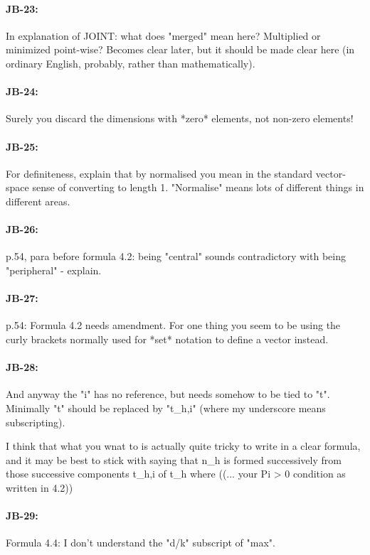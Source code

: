 \documentclass[11pt,a4paper]{article}
\begin{document}
\paragraph{JB-23:} In explanation of JOINT: what does "merged" mean here? Multiplied or minimized point-wise? Becomes clear later, but it should be made clear here (in ordinary English, probably, rather than mathematically).

\paragraph{JB-24:} Surely you discard the dimensions with *zero* elements, not non-zero elements!

\paragraph{JB-25:} For definiteness, explain that by normalised you mean in the standard vector-space sense of converting to length 1. "Normalise" means lots of different things in different areas.

\paragraph{JB-26:} p.54, para before formula 4.2: being "central" sounds contradictory with being "peripheral" - explain.

\paragraph{JB-27:} p.54: Formula 4.2 needs amendment. For one thing you seem to be using the curly brackets normally used for *set* notation to define a vector instead.

\paragraph{JB-28:} And anyway the "i" has no reference, but needs somehow to be tied to "t". Minimally "t" should be replaced by "t\_h,i" (where my underscore means subscripting).

I think that what you wnat to is actually quite tricky to write in a clear formula, and it may be best to stick with saying that n\_h is formed successively from those successive components t\_h,i of t\_h where ((... your Pi > 0 condition as written in 4.2))

\paragraph{JB-29:} Formula 4.4: I don't understand the "d/k" subscript of "max".
\end{document}
